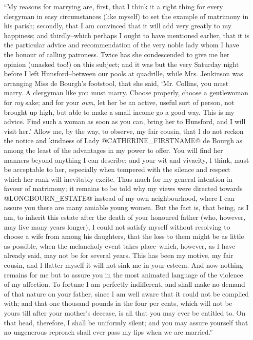 ``My reasons for marrying are, first, that I think it a right thing for
every clergyman in easy circumstances (like myself) to set the example
of matrimony in his parish; secondly, that I am convinced that it will
add very greatly to my happiness; and thirdly--which perhaps I ought
to have mentioned earlier, that it is the particular advice and
recommendation of the very noble lady whom I have the honour of calling
patroness. Twice has she condescended to give me her opinion (unasked
too!) on this subject; and it was but the very Saturday night before I
left Hunsford--between our pools at quadrille, while Mrs. Jenkinson was
arranging Miss de Bourgh's footstool, that she said, `Mr. Collins, you
must marry. A clergyman like you must marry. Choose properly, choose
a gentlewoman for \textit{my} sake; and for your \textit{own}, let her be an active,
useful sort of person, not brought up high, but able to make a small
income go a good way. This is my advice. Find such a woman as soon as
you can, bring her to Hunsford, and I will visit her.' Allow me, by the
way, to observe, my fair cousin, that I do not reckon the notice
and kindness of Lady @CATHERINE_FIRSTNAME@ de Bourgh as among the least of the
advantages in my power to offer. You will find her manners beyond
anything I can describe; and your wit and vivacity, I think, must be
acceptable to her, especially when tempered with the silence and
respect which her rank will inevitably excite. Thus much for my general
intention in favour of matrimony; it remains to be told why my views
were directed towards @LONGBOURN_ESTATE@ instead of my own neighbourhood, where I
can assure you there are many amiable young women. But the fact is, that
being, as I am, to inherit this estate after the death of your honoured
father (who, however, may live many years longer), I could not satisfy
myself without resolving to choose a wife from among his daughters, that
the loss to them might be as little as possible, when the melancholy
event takes place--which, however, as I have already said, may not
be for several years. This has been my motive, my fair cousin, and
I flatter myself it will not sink me in your esteem. And now nothing
remains for me but to assure you in the most animated language of the
violence of my affection. To fortune I am perfectly indifferent, and
shall make no demand of that nature on your father, since I am well
aware that it could not be complied with; and that one thousand pounds
in the four per cents, which will not be yours till after your mother's
decease, is all that you may ever be entitled to. On that head,
therefore, I shall be uniformly silent; and you may assure yourself that
no ungenerous reproach shall ever pass my lips when we are married.''


